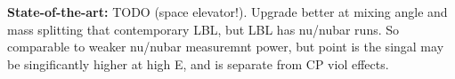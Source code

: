 \documentclass[a4paper,11pt]{article}
\newcounter{bar}
\begin{document}

\noindent \textbf{State-of-the-art:} TODO (space elevator!). Upgrade better at mixing angle and mass splitting that contemporary LBL, but LBL has nu/nubar runs. So comparable to weaker nu/nubar measuremnt power, but point is the singal may be singificantly higher at high E, and is separate from CP viol effects.




\end{document}
